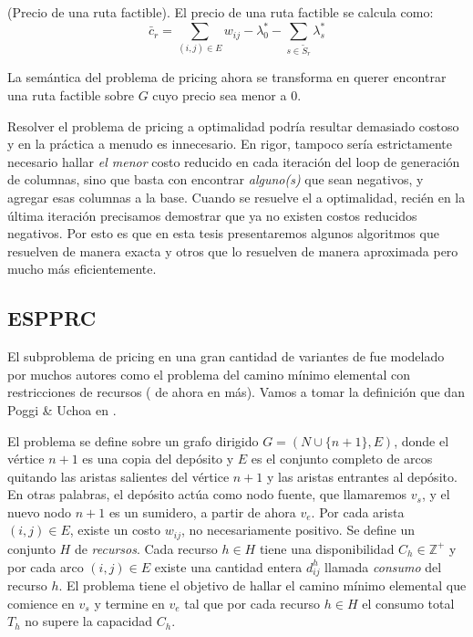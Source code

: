 \begin{definition}
    (Precio de una ruta factible).
    El precio de una ruta factible se calcula como: 
    \begin{equation}
        \bar{c}_r = \sum_{(i, j) \in E}{w_{ij}} - \lambda^*_0 - \sum_{s \in \tilde{S}_r}{\lambda^*_s}
    \end{equation}
\end{definition}

La semántica del problema de pricing ahora se transforma en querer encontrar una ruta factible sobre $G$ cuyo precio sea menor a $0$. 

\label{star-pricing}

Resolver el problema de pricing a optimalidad podría resultar demasiado costoso y en la práctica a menudo es innecesario. En rigor, tampoco sería estrictamente necesario hallar \emph{el menor} costo reducido en cada iteración del loop de generación de columnas, sino que basta con encontrar \emph{alguno(s)} que sean negativos, y agregar esas columnas a la base. Cuando se resuelve el  a optimalidad, recién en la última iteración precisamos demostrar que ya no existen costos reducidos negativos. Por esto es que en esta tesis presentaremos algunos algoritmos que resuelven  de manera exacta y otros que lo resuelven de manera aproximada pero mucho más eficientemente.


\subsection{ESPPRC}

El subproblema de pricing en una gran cantidad de variantes de  fue modelado por muchos autores como el problema del camino mínimo elemental con restricciones de recursos ( de ahora en más). Vamos a tomar la definición que dan Poggi \& Uchoa en \cite{poggi-uchoa}. 

El problema se define sobre un grafo dirigido $G = (N \cup \{n+1\}, E)$, donde el vértice $n+1$ es una copia del depósito y $E$ es el conjunto completo de arcos quitando las aristas salientes del vértice $n+1$ y las aristas entrantes al depósito. En otras palabras, el depósito actúa como nodo fuente, que llamaremos $v_s$, y el nuevo nodo $n+1$ es un sumidero, a partir de ahora $v_e$. Por cada arista $(i, j) \in E$, existe un costo $w_{ij}$, no necesariamente positivo. Se define un conjunto $H$ de \emph{recursos}. Cada recurso $h \in H$ tiene una disponibilidad $C_h \in \mathbb{Z}^{+}$ y por cada arco $(i, j) \in E$ existe una cantidad entera $d_{ij}^{h}$ llamada \emph{consumo} del recurso $h$. El problema  tiene el objetivo de hallar el camino mínimo elemental que comience en $v_s$ y termine en $v_e$ tal que por cada recurso $h \in H$ el consumo total $T_h$ no supere la capacidad $C_h$. 

